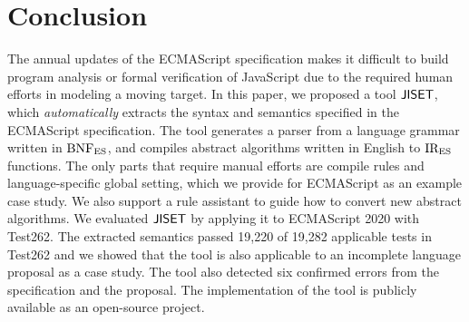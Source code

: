 \section{Conclusion}\label{sec:conclude}
The annual updates of the ECMAScript specification makes it difficult to
build program analysis or formal verification of JavaScript due to the
required human efforts in modeling a moving target.  In this paper,
we proposed a tool \( \text{\sf JISET} \), which \textit{automatically} extracts the
syntax and semantics specified in the ECMAScript specification.  The tool
generates a parser from a language grammar written in \( \text{BNF}_{\text{ES}} \), and
compiles abstract algorithms written in English to \( \text{IR}_\text{ES} \) functions.
The only parts that require manual efforts are compile rules and
language-specific global setting, which we provide for ECMAScript
as an example case study.  We also support a rule assistant to guide
how to convert new abstract algorithms.  We evaluated \( \text{\sf JISET} \) by
applying it to ECMAScript 2020 with Test262.  The extracted semantics
passed 19,220 of 19,282 applicable tests in Test262 and we showed
that the tool is also applicable to an incomplete language proposal as
a case study.  The tool also detected six confirmed errors from the
specification and the proposal. The implementation of the tool is
publicly available as an open-source project.
